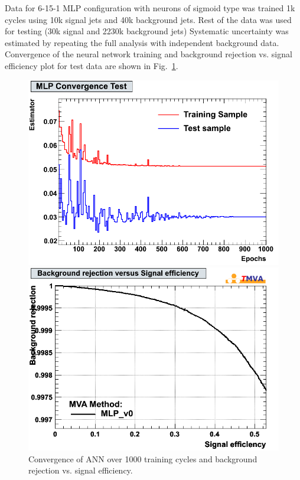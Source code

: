 \documentclass[a4paper]{jpconf}
\begin{document}
Data for 6-15-1 MLP configuration with neurons of sigmoid type was trained 1k cycles using
10k signal jets and 40k background jets. 
Rest of the data was used for testing (30k signal and 2230k background jets)
Systematic uncertainty was estimated by repeating the full analysis with independent background data.
Convergence of the neural network training and 
background rejection vs. signal efficiency plot  for test data are shown in Fig.~\ref{fig:nn}.

\begin{figure}[h]
 \begin{minipage}{8.1cm}
\includegraphics[width=1.0\textwidth]{images/MLPConvergenceTest.png}
\end{minipage}
 \hfill
\begin{minipage}{8.1cm}

\includegraphics[width=1.0\textwidth]{images/roc.png}
\end{minipage}
\caption{Convergence of ANN over 1000 training cycles and background rejection vs. signal efficiency.}
\label{fig:nn}
\end{figure}
\end{document}
